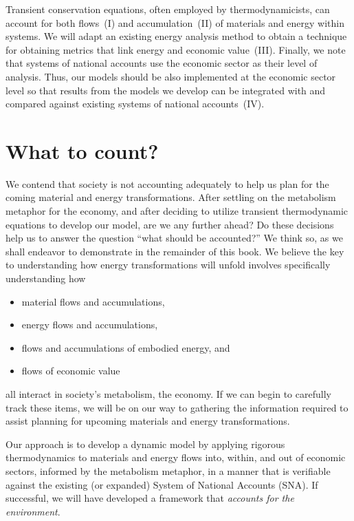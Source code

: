 Transient conservation equations, often employed by thermodynamicists, 
can account for both flows~(I) and accumulation~(II) of materials
and energy within systems.
We will adapt an existing energy analysis method to obtain a 
technique for obtaining metrics that link energy and economic value~(III).
Finally, we note that systems of national accounts use the economic sector
as their level of analysis. 
Thus, our models should be also implemented at the economic sector level
so that results from the models we develop can be 
integrated with and compared against existing systems of national accounts~(IV).


\section{What to count?}
\label{sec:what_to_count}

We contend that society is not accounting adequately %
to help us plan for the coming material and energy transformations.
After settling on the metabolism metaphor for the economy, 
and after deciding to utilize transient thermodynamic equations to develop our model, 
are we any further ahead? 
Do these decisions help us to answer the question ``what should be accounted?''
We think so, as we shall endeavor to demonstrate in the remainder of this book.
We believe the key to understanding how energy transformations will unfold
involves specifically understanding how 

\begin{itemize}
	\item{material flows and accumulations,}
	\item{energy flows and accumulations,}
	\item{flows and accumulations of embodied energy, and}
	\item{flows of economic value}
\end{itemize}

\noindent{}all interact in society's metabolism, the economy.
If we can begin to carefully track these items, 
we will be on our way to gathering the information required to 
assist planning for upcoming materials and energy transformations.

Our approach is to develop a dynamic model 
by applying rigorous thermodynamics 
to materials and energy
flows into, within, and out of economic sectors,
informed by the metabolism metaphor,
in a manner that is verifiable against 
the existing (or expanded) System of National Accounts (SNA).
If successful, we will have developed a framework 
that \emph{accounts for the environment}. 


